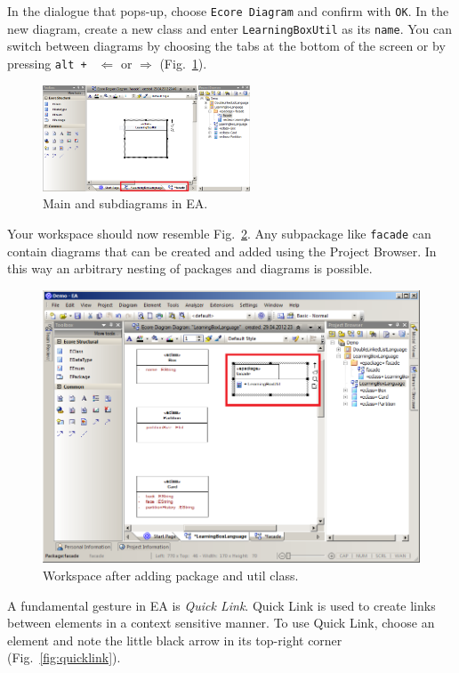 In the dialogue that pops-up, choose \texttt{Ecore Diagram} and confirm with
\texttt{OK}.
In the new diagram, create a new class and enter \texttt{LearningBoxUtil} as its
\texttt{name}.  You can switch between diagrams by choosing the tabs at the
bottom of the screen or by pressing \texttt{alt + } $\Leftarrow$ or
$\Rightarrow$ (Fig.~\ref{fig:epackage_newdiagram}). 

\begin{figure}[htbp] 
	\centering
  \includegraphics[width=0.55\textwidth]{pics/memBoxBilder/memBox20}
	\caption{Main and subdiagrams in EA.}
	\label{fig:epackage_newdiagram}
\end{figure}
\clearpage 

Your workspace should now resemble Fig.~\ref{fig:epackage_completed}.
Any subpackage like \texttt{facade} can contain diagrams that can be
created and added using the Project Browser. 
In this way an arbitrary nesting of packages and diagrams is possible.

\begin{figure}[htbp]
	\centering
  \includegraphics[width=.8\textwidth]{pics/memBoxBilder/memBox22.png}
	\caption{Workspace after adding package and util class.}
	\label{fig:epackage_completed}
\end{figure}

A fundamental gesture in EA is \emph{Quick Link}.  Quick Link is used to create
links between elements in a context sensitive manner.  To use Quick Link,
choose an element and note the little black arrow in its top-right corner
(Fig.~\ref{fig:quicklink}). 

